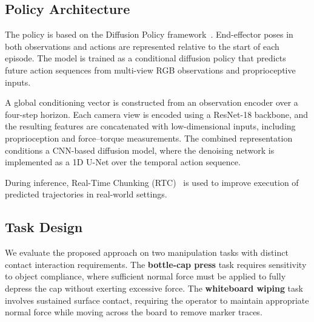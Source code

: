 \documentclass[letterpaper, 10 pt, conference]{ieeeconf}  %
\begin{document}

\subsection{Policy Architecture}
The policy is based on the Diffusion Policy framework~\cite{chi2024diffusionpolicy}. End-effector poses in both observations and actions are represented relative to the start of each episode. The model is trained as a conditional diffusion policy that predicts future action sequences from multi-view RGB observations and proprioceptive inputs.

A global conditioning vector is constructed from an observation encoder over a four-step horizon. Each camera view is encoded using a ResNet-18 backbone\cite{he2016resnet}, and the resulting features are concatenated with low-dimensional inputs, including proprioception and force–torque measurements. The combined representation conditions a CNN-based diffusion model, where the denoising network is implemented as a 1D U-Net \cite{ronneberger2015unet} over the temporal action sequence.

During inference, Real-Time Chunking (RTC)~\cite{black2025realtimeexecutionactionchunking} is used to improve execution of predicted trajectories in real-world settings.


\subsection{Task Design}
We evaluate the proposed approach on two manipulation tasks with distinct contact interaction requirements. The \textbf{bottle-cap press} task requires sensitivity to object compliance, where sufficient normal force must be applied to fully depress the cap without exerting excessive force. The \textbf{whiteboard wiping} task involves sustained surface contact, requiring the operator to maintain appropriate normal force while moving across the board to remove marker traces.
\end{document}
